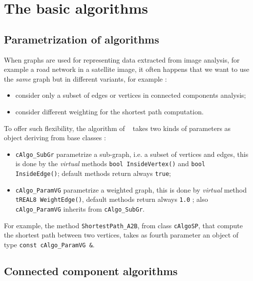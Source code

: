 \section{The basic algorithms}
\label{Graph:Algo}


\subsection{Parametrization of algorithms}

When graphs are used for representing data extracted from image analysis, for example a road
network in a satellite image, it often happens that we want to use the \emph{same} graph 
but in different variants, for example :

\begin{itemize}
    \item  consider only a subset of edges or vertices in connected components analysis;
    \item  consider different weighting for the shortest path computation.
\end{itemize}

To offer such flexibility, the algorithm of \PPP~ takes two kinds of parameters as object
deriving from base classes :

\begin{itemize}
    \item   {\tt cAlgo\_SubGr} parametrize a sub-graph, i.e. a subset of vertices and edges,
            this is done by the \emph{virtual} methods {\tt bool InsideVertex()} and {\tt bool InsideEdge()};
            default methods return always {\tt true};

    \item   {\tt cAlgo\_ParamVG} parametrize a weighted graph, this is done by  \emph{virtual} method
            {\tt tREAL8 WeightEdge()}, default methods return always {\tt 1.0} ;
            also {\tt cAlgo\_ParamVG} inherits from  {\tt cAlgo\_SubGr}.
\end{itemize}

For example, the method {\tt ShortestPath\_A2B}, from class {\tt cAlgoSP}, that compute the shortest path
between two vertices, takes as fourth parameter an object of type {\tt const cAlgo\_ParamVG \&}.



\subsection{Connected component algorithms}


